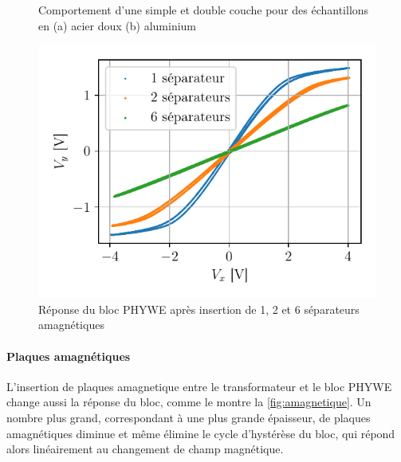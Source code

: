 \begin{figure}[h]
\begin{subfigure}{0.5\linewidth}
        \caption{}
        \label{fig:alu_combo}
    \end{subfigure}
    \caption{Comportement d'une simple et double couche pour des échantillons en (a) acier doux (b) aluminium}
    \label{fig:combo}
\end{figure}

\begin{figure}
    \centering
    \includegraphics[width=\linewidth]{figures/separateurs_amagnetique.pdf}
    \caption{Réponse du bloc PHYWE après insertion de 1, 2 et 6 séparateurs amagnétiques}
    \label{fig:amagnetique}
\end{figure}

\paragraph{Plaques amagnétiques}
L'insertion de plaques amagnetique entre le transformateur et le bloc PHYWE change aussi la réponse du bloc, comme le montre la \autoref{fig:amagnetique}. Un nombre plus grand, correspondant à une plus grande épaisseur, de plaques amagnétiques diminue et même élimine le cycle d'hystérèse du bloc, qui répond alors linéairement au changement de champ magnétique.


